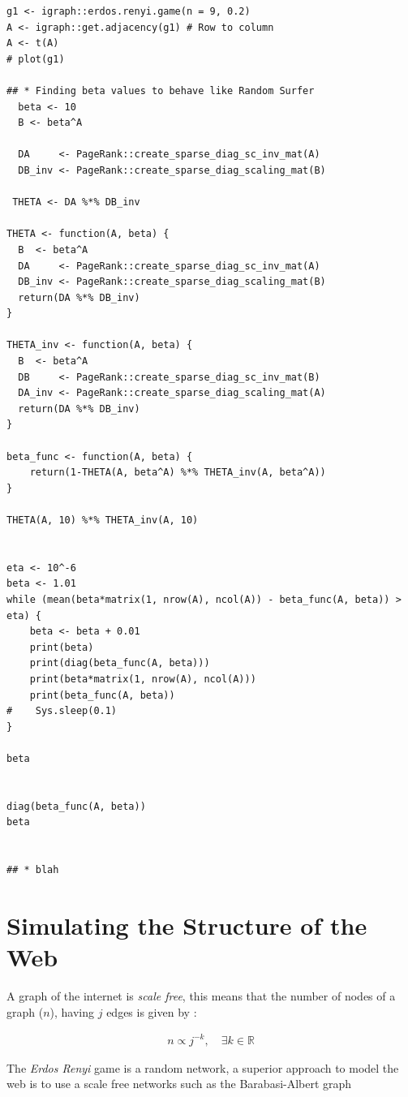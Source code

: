 \documentclass[11pt]{article}
\begin{document}
\begin{verbatim}
g1 <- igraph::erdos.renyi.game(n = 9, 0.2)
A <- igraph::get.adjacency(g1) # Row to column
A <- t(A)
# plot(g1)

## * Finding beta values to behave like Random Surfer
  beta <- 10
  B <- beta^A

  DA     <- PageRank::create_sparse_diag_sc_inv_mat(A)
  DB_inv <- PageRank::create_sparse_diag_scaling_mat(B)

 THETA <- DA %*% DB_inv

THETA <- function(A, beta) {
  B  <- beta^A
  DA     <- PageRank::create_sparse_diag_sc_inv_mat(A)
  DB_inv <- PageRank::create_sparse_diag_scaling_mat(B)
  return(DA %*% DB_inv)
}

THETA_inv <- function(A, beta) {
  B  <- beta^A
  DB     <- PageRank::create_sparse_diag_sc_inv_mat(B)
  DA_inv <- PageRank::create_sparse_diag_scaling_mat(A)
  return(DA %*% DB_inv)
}

beta_func <- function(A, beta) {
    return(1-THETA(A, beta^A) %*% THETA_inv(A, beta^A))
}

THETA(A, 10) %*% THETA_inv(A, 10)


eta <- 10^-6
beta <- 1.01
while (mean(beta*matrix(1, nrow(A), ncol(A)) - beta_func(A, beta)) > eta) {
    beta <- beta + 0.01
    print(beta)
    print(diag(beta_func(A, beta)))
    print(beta*matrix(1, nrow(A), ncol(A)))
    print(beta_func(A, beta))
#    Sys.sleep(0.1)
}

beta


diag(beta_func(A, beta))
beta


## * blah
\end{verbatim}
\section{Simulating the Structure of the Web}
\label{sec:org37b8043}
A graph of the internet is \emph{scale free}, this means that the number of nodes of a graph (\(n\)), having \(j\) edges is given by \cite[.2]{langvilleGooglePageRankScience2012}:

\begin{align}
n \propto j^{-k}, \quad \exists k \in \mathbb{R}
\end{align}

The \emph{Erdos Renyi} game is a random network, a superior approach to model the web is to use a scale free networks \cite{barabasiPhysicsWeb2001} such as the Barabasi-Albert graph \cite{barabasiScalefreeCharacteristicsRandom2000}
\end{document}
